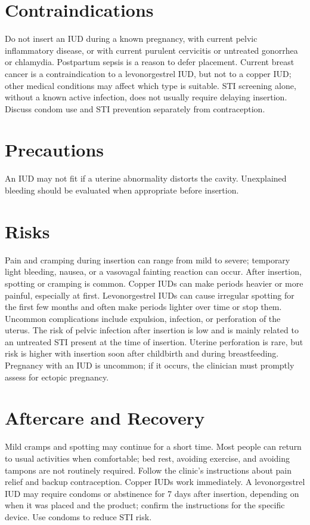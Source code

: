 \section*{Contraindications}
Do not insert an IUD during a known pregnancy, with current pelvic inflammatory disease, or with current purulent cervicitis or untreated gonorrhea or chlamydia. Postpartum sepsis is a reason to defer placement. Current breast cancer is a contraindication to a levonorgestrel IUD, but not to a copper IUD; other medical conditions may affect which type is suitable. STI screening alone, without a known active infection, does not usually require delaying insertion. Discuss condom use and STI prevention separately from contraception.

\section*{Precautions}
An IUD may not fit if a uterine abnormality distorts the cavity. Unexplained bleeding should be evaluated when appropriate before insertion.

\section*{Risks}
Pain and cramping during insertion can range from mild to severe; temporary light bleeding, nausea, or a vasovagal fainting reaction can occur. After insertion, spotting or cramping is common. Copper IUDs can make periods heavier or more painful, especially at first. Levonorgestrel IUDs can cause irregular spotting for the first few months and often make periods lighter over time or stop them. Uncommon complications include expulsion, infection, or perforation of the uterus. The risk of pelvic infection after insertion is low and is mainly related to an untreated STI present at the time of insertion. Uterine perforation is rare, but risk is higher with insertion soon after childbirth and during breastfeeding. Pregnancy with an IUD is uncommon; if it occurs, the clinician must promptly assess for ectopic pregnancy.

\section*{Aftercare and Recovery}
Mild cramps and spotting may continue for a short time. Most people can return to usual activities when comfortable; bed rest, avoiding exercise, and avoiding tampons are not routinely required. Follow the clinic's instructions about pain relief and backup contraception. Copper IUDs work immediately. A levonorgestrel IUD may require condoms or abstinence for 7 days after insertion, depending on when it was placed and the product; confirm the instructions for the specific device. Use condoms to reduce STI risk.

